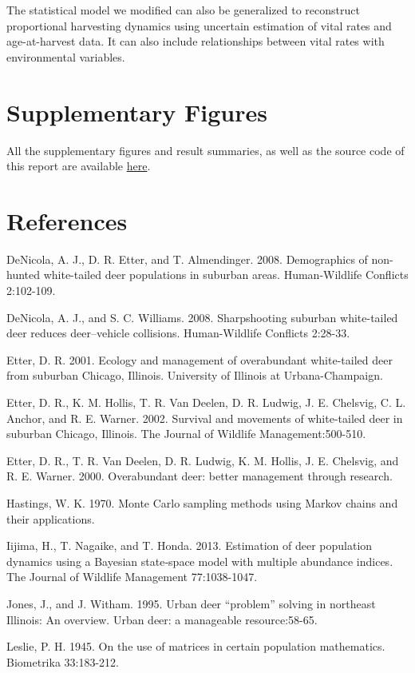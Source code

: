 \documentclass[]{article}
\begin{document}
The statistical model we modified can also be generalized to reconstruct proportional harvesting dynamics using uncertain estimation of vital rates and age-at-harvest data. It can also include relationships between vital rates with environmental variables.  

\section{Supplementary Figures}
All the supplementary figures and result summaries, as well as the source code of this report are available \href{https://github.com/YunyiShen/DDLeslieReconstruct/tree/least_files/figs/adult_homo_harv}{here}.
\section{References}
DeNicola, A. J., D. R. Etter, and T. Almendinger. 2008. Demographics of non-hunted white-tailed deer populations in suburban areas. Human-Wildlife Conflicts 2:102-109.

DeNicola, A. J., and S. C. Williams. 2008. Sharpshooting suburban white-tailed deer reduces deer–vehicle collisions. Human-Wildlife Conflicts 2:28-33.

Etter, D. R. 2001. Ecology and management of overabundant white-tailed deer from suburban Chicago, Illinois. University of Illinois at Urbana-Champaign.

Etter, D. R., K. M. Hollis, T. R. Van Deelen, D. R. Ludwig, J. E. Chelsvig, C. L. Anchor, and R. E. Warner. 2002. Survival and movements of white-tailed deer in suburban Chicago, Illinois. The Journal of Wildlife Management:500-510.

Etter, D. R., T. R. Van Deelen, D. R. Ludwig, K. M. Hollis, J. E. Chelsvig, and R. E. Warner. 2000. Overabundant deer: better management through research.

Hastings, W. K. 1970. Monte Carlo sampling methods using Markov chains and their applications.

Iijima, H., T. Nagaike, and T. Honda. 2013. Estimation of deer population dynamics using a Bayesian state‐space model with multiple abundance indices. The Journal of Wildlife Management 77:1038-1047.

Jones, J., and J. Witham. 1995. Urban deer “problem” solving in northeast Illinois: An overview. Urban deer: a manageable resource:58-65.

Leslie, P. H. 1945. On the use of matrices in certain population mathematics. Biometrika 33:183-212.
\end{document}

